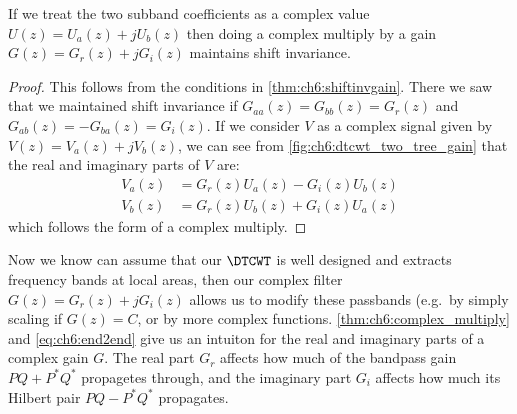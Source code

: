 \begin{theorem}\label{thm:ch6:complex_multiply}
  If we treat the two subband coefficients as a complex value $U(z) = U_a(z) +
  jU_b(z)$ then doing a complex multiply by a gain $G(z) = G_r(z) + jG_i(z)$
  maintains shift invariance.
\end{theorem}
\begin{proof}
  This follows from the conditions in \autoref{thm:ch6:shiftinvgain}. There we
  saw that we maintained shift invariance if 
  $G_{aa}(z) = G_{bb}(z) = G_r(z)$ and $G_{ab}(z) = -G_{ba}(z) = G_i(z)$. 
  If we consider $V$ as a complex signal given by $V(z) = V_a(z) + jV_b(z)$, we
  can see from \autoref{fig:ch6:dtcwt_two_tree_gain} that the real and imaginary
  parts of $V$ are:
  \begin{align}
    V_a(z) &= G_r(z) U_a(z) - G_i(z) U_b(z) \\
    V_b(z) &= G_r(z) U_b(z) + G_i(z) U_a(z) 
  \end{align}
  which follows the form of a complex multiply.
\end{proof}

Now we know can assume that our $\DTCWT$ is well designed and extracts frequency
bands at local areas, then our complex filter $G(z)=G_r(z) + jG_i(z)$ allows us
to modify these passbands (e.g.\ by simply scaling if $G(z) = C$, or by more
complex functions.
\autoref{thm:ch6:complex_multiply} and \eqref{eq:ch6:end2end} give us an intuiton for the real and
imaginary parts of a complex gain $G$. The real part $G_r$ affects how much of
the bandpass gain $PQ + P^*Q^*$ propagetes through, and the imaginary part $G_i$
affects how much its Hilbert pair $PQ-P^*Q^*$ propagates.
